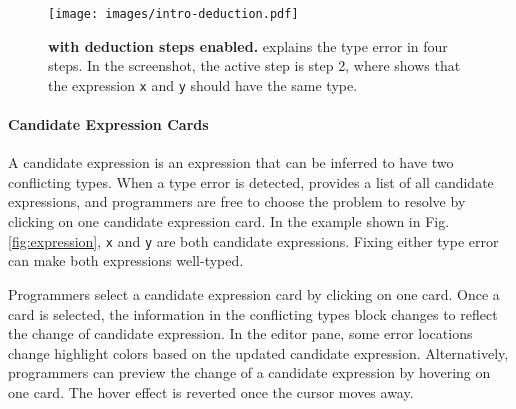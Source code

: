 \begin{figure}[ht]
    \centering
    \texttt{[image: images/intro-deduction.pdf]}
    \caption[\chameleon{} with deduction steps enabled]{
        \textbf{\chameleon{} with deduction steps enabled.}
        \chameleon{} explains the type error in four steps. In the screenshot, the active step is step 2, where \chameleon{} shows that the expression \texttt{x} and \texttt{y} should have the same type. 
    }
    \label{fig:deduction}
\end{figure}



\paragraph{Candidate Expression Cards}  \label{sub:candidate-expression}


A candidate expression is an expression that can be inferred to have two conflicting types. 
When a type error is detected, \chameleon{} provides a list of all candidate expressions, and programmers are free to choose the problem to resolve by clicking on one candidate expression card. In the example shown in Fig. \ref{fig:expression}, \texttt{x} and \texttt{y} are both candidate expressions. Fixing either type error can make both expressions well-typed.




Programmers select a candidate expression card by clicking on one card. Once a card is selected, the information in the conflicting types block changes to reflect the change of candidate expression. In the editor pane, some error locations change highlight colors based on the updated candidate expression. Alternatively, programmers can preview the change of a candidate expression by hovering on one card. The hover effect is reverted once the cursor moves away. 


